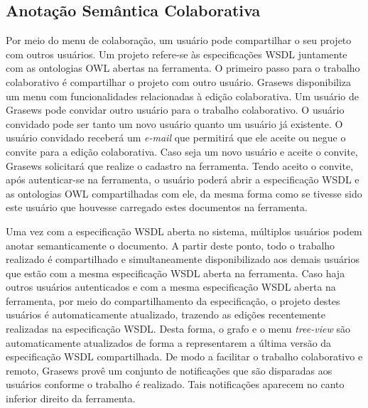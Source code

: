 \subsection{Anotação Semântica Colaborativa}\label{4-edicacao-semantica-colaborativa}

Por meio do menu de colaboração, um usuário pode compartilhar o seu projeto com outros usuários. Um projeto refere-se às especificações WSDL juntamente com as ontologias OWL abertas na ferramenta. O primeiro passo para o trabalho colaborativo é compartilhar o projeto com outro usuário. Grasews disponibiliza um menu com funcionalidades relacionadas à edição colaborativa. Um usuário de Grasews pode convidar outro usuário para o trabalho colaborativo. O usuário convidado pode ser tanto um novo usuário quanto um usuário já existente. O usuário convidado receberá um \textit{e-mail} que permitirá que ele aceite ou negue o convite para a edição colaborativa. Caso seja um novo usuário e aceite o convite, Grasews solicitará que realize o cadastro na ferramenta. Tendo aceito o convite, após autenticar-se na ferramenta, o usuário poderá abrir a especificação WSDL e as ontologias OWL compartilhadas com ele, da mesma forma como se tivesse sido este usuário que houvesse carregado estes documentos na ferramenta.

Uma vez com a especificação WSDL aberta no sistema, múltiplos usuários podem anotar semanticamente o documento. A partir deste ponto, todo o trabalho realizado é compartilhado e simultaneamente disponibilizado aos demais usuários que estão com a mesma especificação WSDL aberta na ferramenta. Caso haja outros usuários autenticados e com a mesma especificação WSDL aberta na ferramenta, por meio do compartilhamento da especificação, o projeto destes usuários é automaticamente atualizado, trazendo as edições recentemente realizadas na especificação WSDL. Desta forma, o grafo e o menu \textit{tree-view} são automaticamente atualizados de forma a representarem a última versão da especificação WSDL compartilhada. De modo a facilitar o trabalho colaborativo e remoto, Grasews provê um conjunto de notificações que são disparadas aos usuários conforme o trabalho é realizado. Tais notificações aparecem no canto inferior direito da ferramenta.

